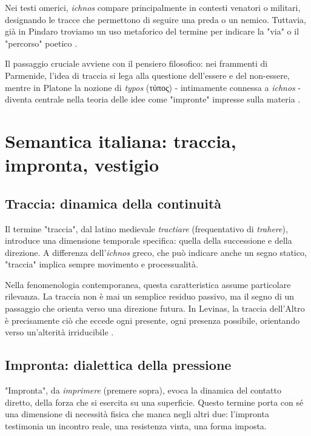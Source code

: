 \documentclass{gs}
\begin{document}
Nei testi omerici, \textit{ichnos} compare principalmente in contesti venatori o militari, designando le tracce che permettono di seguire una preda o un nemico. Tuttavia, già in Pindaro troviamo un uso metaforico del termine per indicare la "via" o il "percorso" poetico \cite{pindar1997}. 

Il passaggio cruciale avviene con il pensiero filosofico: nei frammenti di Parmenide, l'idea di traccia si lega alla questione dell'essere e del non-essere, mentre in Platone la nozione di \textit{typos} (τύπος) - intimamente connessa a \textit{ichnos} - diventa centrale nella teoria delle idee come "impronte" impresse sulla materia \cite{plato1997republic}.

\section{Semantica italiana: traccia, impronta, vestigio}

\subsection{Traccia: dinamica della continuità}

Il termine "traccia", dal latino medievale \textit{tractiare} (frequentativo di \textit{trahere}), introduce una dimensione temporale specifica: quella della successione e della direzione. A differenza dell'\textit{ichnos} greco, che può indicare anche un segno statico, "traccia" implica sempre movimento e processualità.

Nella fenomenologia contemporanea, questa caratteristica assume particolare rilevanza. La traccia non è mai un semplice residuo passivo, ma il segno di un passaggio che orienta verso una direzione futura. In Levinas, la traccia dell'Altro è precisamente ciò che eccede ogni presente, ogni presenza possibile, orientando verso un'alterità irriducibile \cite{levinas1974}.

\subsection{Impronta: dialettica della pressione}

"Impronta", da \textit{imprimere} (premere sopra), evoca la dinamica del contatto diretto, della forza che si esercita su una superficie. Questo termine porta con sé una dimensione di necessità fisica che manca negli altri due: l'impronta testimonia un incontro reale, una resistenza vinta, una forma imposta.
\end{document}
